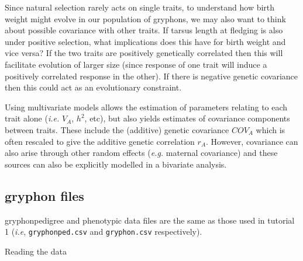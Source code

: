 \documentclass[12pt,]{book}
\newenvironment{Shaded}{\begin{snugshade}}{\end{snugshade}}
\newcommand{\KeywordTok}[1]{\textcolor[rgb]{0.13,0.29,0.53}{\textbf{#1}}}
\newcommand{\NormalTok}[1]{#1}
\newcommand{\OperatorTok}[1]{\textcolor[rgb]{0.81,0.36,0.00}{\textbf{#1}}}
\newcommand{\StringTok}[1]{\textcolor[rgb]{0.31,0.60,0.02}{#1}}
\begin{document}
Since natural selection rarely acts on single traits, to understand how birth weight might evolve in our population of gryphons, we may also want to think about possible covariance with other traits. If tarsus length at fledging is also under positive selection, what implications does this have for birth weight and vice versa? If the two traits are positively genetically correlated then this will facilitate evolution of larger size (since response of one trait will induce a positively correlated response in the other). If there is negative genetic covariance then this could act as an evolutionary constraint.

Using multivariate models allows the estimation of parameters relating to each trait alone (\emph{i.e.} \(V_A\), \(h^2\), etc), but also yields estimates of covariance components between traits. These include the (additive) genetic covariance \(COV_A\) which is often rescaled to give the additive genetic correlation \(r_A\). However, covariance can also arise through other random effects (\emph{e.g.} maternal covariance) and these sources can also be explicitly modelled in a bivariate analysis.

\hypertarget{gryphon-files}{%
\subsection{gryphon files}\label{gryphon-files}}

gryphonpedigree and phenotypic data files are the same as those used in tutorial 1 (\emph{i.e}, \texttt{gryphonped.csv} and \texttt{gryphon.csv} respectively).

Reading the data

\begin{Shaded}
\end{Shaded}
\end{document}
